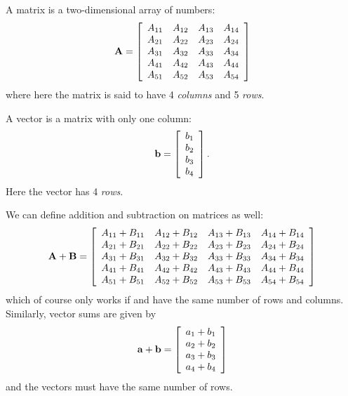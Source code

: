 A matrix is a two-dimensional array of numbers:
\begin{equation}
	\mathbf{A} = 
		\left[\begin{array}{cccc}
			A_{11} & A_{12} & A_{13} & A_{14} \\
			A_{21} & A_{22} & A_{23} & A_{24} \\
			A_{31} & A_{32} & A_{33} & A_{34} \\
			A_{41} & A_{42} & A_{43} & A_{44} \\
			A_{51} & A_{52} & A_{53} & A_{54} \\
		\end{array}\right]
\end{equation}
where here the matrix  is said to have 4
\emph{columns} and 5 \emph{rows}. 

A vector is a matrix with only one column:
\begin{equation}
	\mathbf{b} = \left[\begin{array}{c}
			b_1 \\ b_2 \\ b_3 \\ b_4
			\end{array}\right].
\end{equation}
Here the vector  has 4 \emph{rows}.

We can define addition and subtraction on matrices as well:
\begin{equation}
	\mathbf{A} + \mathbf{B} = 
		\left[\begin{array}{cccc}
	A_{11}+B_{11}  & A_{12}+B_{12}  & A_{13}+B_{13}  & A_{14}+B_{14}  \\
	A_{21}+B_{21}  & A_{22}+B_{22}  & A_{23}+B_{23}  & A_{24}+B_{24}  \\
	A_{31}+B_{31}  & A_{32}+B_{32}  & A_{33}+B_{33}  & A_{34}+B_{34}  \\
	A_{41}+B_{41}  & A_{42}+B_{42}  & A_{43}+B_{43}  & A_{44}+B_{44}  \\
	A_{51}+B_{51}  & A_{52}+B_{52}  & A_{53}+B_{53}  & A_{54}+B_{54}  \\
		\end{array}\right]
\end{equation}
which of course only works if  and  have the same
number of rows and columns. Similarly, vector sums are given by
\begin{equation}
	\mathbf{a}+\mathbf{b} = \left[\begin{array}{c}
			a_1+b_1 \\ a_2+b_2 \\ a_3+b_3 \\ a_4+b_4
			\end{array}\right]
\end{equation}
and the vectors must have the same number of rows.

